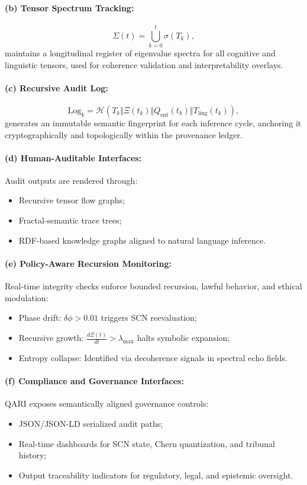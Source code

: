 \documentclass[12pt]{article}
\begin{document}
\paragraph{(b) Tensor Spectrum Tracking:}
\[
\Sigma(t) = \bigcup_{k=0}^{t} \sigma(T_k),
\]
maintains a longitudinal register of eigenvalue spectra for all cognitive and linguistic tensors, used for coherence validation and interpretability overlays.

\paragraph{(c) Recursive Audit Log:}
\[
\text{Log}_k = \mathcal{H}(T_k \Vert \Xi(t_k) \Vert Q_{\text{ent}}(t_k) \Vert T_{\text{ling}}(t_k)),
\]
generates an immutable semantic fingerprint for each inference cycle, anchoring it cryptographically and topologically within the provenance ledger.

\paragraph{(d) Human-Auditable Interfaces:}
Audit outputs are rendered through:
\begin{itemize}
    \item Recursive tensor flow graphs;
    \item Fractal-semantic trace trees;
    \item RDF-based knowledge graphs aligned to natural language inference.
\end{itemize}

\paragraph{(e) Policy-Aware Recursion Monitoring:}
Real-time integrity checks enforce bounded recursion, lawful behavior, and ethical modulation:
\begin{itemize}
    \item Phase drift: \( \delta\phi > 0.01 \) triggers SCN reevaluation;
    \item Recursive growth: \( \frac{d\Xi(t)}{dt} > \lambda_{\text{max}} \) halts symbolic expansion;
    \item Entropy collapse: Identified via decoherence signals in spectral echo fields.
\end{itemize}

\paragraph{(f) Compliance and Governance Interfaces:}
QARI exposes semantically aligned governance controls:
\begin{itemize}
    \item JSON/JSON-LD serialized audit paths;
    \item Real-time dashboards for SCN state, Chern quantization, and tribunal history;
    \item Output traceability indicators for regulatory, legal, and epistemic oversight.
\end{itemize}
\end{document}
